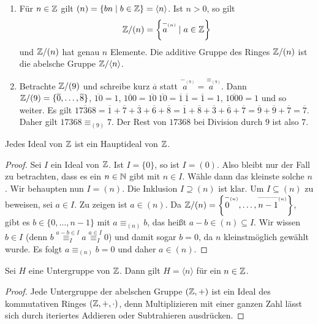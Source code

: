 \documentclass[../../main.tex]{subfiles}
\begin{document}
\begin{bsp}\label{3.3.12}
\begin{enumerate}[\normalfont(a)]
\item Für $n\in\mathbb Z$ gilt $(n)=\{bn\mid b\in\mathbb Z\}=\langle n\rangle$. Ist $n>0$, so gilt
$$\mathbb Z/(n)=\left\{\overset{-_{(n)}}{a~~~}\mid a\in\mathbb Z\right\}$$
und
 $\mathbb Z/(n)$ hat genau $n$ Elemente. Die additive Gruppe des Ringes $\mathbb Z/(n)$ ist die abelsche Gruppe $\mathbb Z/\langle n\rangle$.
 \item Betrachte $\mathbb Z/(9)$ und schreibe kurz $\overline a$ statt $\overset{-_{(9)}}{a~~~}=\overset{\equiv_{(9)}}{a~~~}$. Dann
 $\mathbb Z/(9)=\{\overline 0,\dots,\overline 8\}$, $\overline{10}=1$, $\overline{100}=\overline{10}~\overline{10}=\overline 1~\overline1=\overline1=1$,
 $\overline{1000}=1$ und so weiter. Es gilt $\overline{17368}=\overline1+\overline7+\overline3+\overline6+\overline8=\overline1+\overline8+\overline3+\overline6+\overline7=
 \overline9+\overline9+\overline7=\overline7$. Daher gilt $17368\equiv_{(9)}7$. Der Rest von $17368$ bei Division durch $9$ ist also $7$.
\end{enumerate}
\end{bsp}

\begin{sat}\label{3.3.13}
Jedes Ideal von $\mathbb Z$ ist ein Hauptideal von $\mathbb Z$.
\end{sat}

\begin{proof}
Sei $I$ ein Ideal von $\mathbb Z$. Ist $I=\{0\}$, so ist $I=(0)$. Also bleibt nur der Fall zu betrachten, dass es ein $n\in\mathbb N$ gibt mit $n\in I$. Wähle dann das kleinste solche $n$. Wir behaupten nun $I=(n)$. Die Inklusion $I\supseteq(n)$ ist klar. Um $I\subseteq(n)$ zu beweisen, sei $a\in I$. Zu zeigen ist $a\in(n)$. Da
$\mathbb Z/(n)=\left\{\overset{-_{(n)}}{0~~~},\dots,\overset{\text{---------}_{(n)}}{n-1~~~}\right\}$, gibt es $b\in\{0,\dots,n-1\}$ mit $a\equiv_{(n)}b$, das heißt $a-b\in(n)\subseteq I$. Wir wissen
$b\in I$ (denn $b\overset{a-b\in I}{\equiv_I}a\overset{a\in I}{\equiv_I}0$) und damit sogar $b=0$, da $n$ kleinstmöglich gewählt wurde. Es folgt $a\equiv_{(n)}b=0$ und daher
$a\in(n)$.
\end{proof}

\begin{kor}\label{3.3.14}
Sei $H$ eine Untergruppe von $\mathbb Z$. Dann gilt $H=\langle n\rangle$ für ein $n\in\mathbb Z$.
\end{kor}

\begin{proof}
Jede Untergruppe der abelschen Gruppe $(\mathbb Z,+)$ ist ein Ideal des kommutativen Ringes $(\mathbb Z,+,\cdot)$, denn Multiplizieren mit einer ganzen Zahl lässt sich durch iteriertes
Addieren oder Subtrahieren ausdrücken.
\end{proof}
\end{document}
